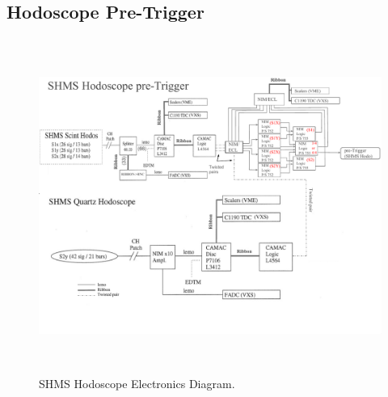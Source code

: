 \documentclass[11pt]{article}
\begin{document}
\subsection{Hodoscope Pre-Trigger}
\begin{figure}[h!]
  \centering
  \includegraphics[width=7.0in, height=4.3in]{SHMS_HODO_TRIGGER.pdf}
  \caption{SHMS Hodoscope Electronics Diagram.}
  \label{fig:shms_hod_trg}
\end{figure}
\end{document}
